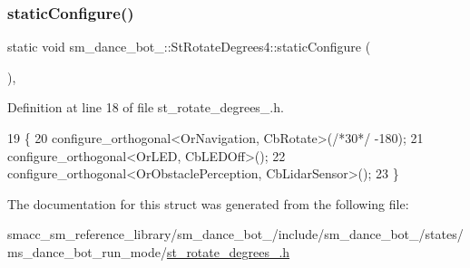 \subsubsection{\texorpdfstring{static\+Configure()}{staticConfigure()}}
{\footnotesize\ttfamily static void sm\+\_\+dance\+\_\+bot\+\_\+::\+St\+Rotate\+Degrees4\+::static\+Configure (\begin{DoxyParamCaption}{ }\end{DoxyParamCaption})\hspace{0.3cm}{\ttfamily [inline]}, {\ttfamily [static]}}



Definition at line 18 of file st\+\_\+rotate\+\_\+degrees\+\_.\+h.


\begin{DoxyCode}
19   \{
20     configure\_orthogonal<OrNavigation, CbRotate>(\textcolor{comment}{/*30*/} -180);
21     configure\_orthogonal<OrLED, CbLEDOff>();
22     configure\_orthogonal<OrObstaclePerception, CbLidarSensor>();
23   \}
\end{DoxyCode}


The documentation for this struct was generated from the following file\+:\begin{DoxyCompactItemize}
\item 
smacc\+\_\+sm\+\_\+reference\+\_\+library/sm\+\_\+dance\+\_\+bot\+\_/include/sm\+\_\+dance\+\_\+bot\+\_/states/ms\+\_\+dance\+\_\+bot\+\_\+run\+\_\+mode/\hyperlink{sm__dance__bot__2_2include_2sm__dance__bot__2_2states_2ms__dance__bot__run__mode_2st__rotate__degrees__4_8h}{st\+\_\+rotate\+\_\+degrees\+\_.\+h}\end{DoxyCompactItemize}
